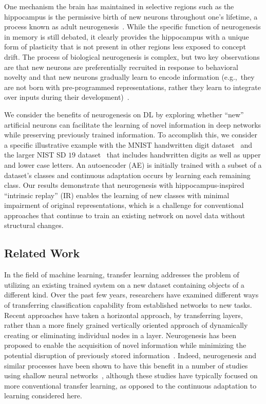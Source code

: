 \documentclass[10pt,conference]{IEEEtran}
\begin{document}
One mechanism the brain has maintained in selective regions such as the hippocampus is the permissive birth of new neurons throughout one's lifetime, a process known as adult neurogenesis~\cite{aimone2014regulation}. While the specific function of neurogenesis in memory is still debated, it clearly provides the hippocampus with a unique form of plasticity that is not present in other regions less exposed to concept drift. The process of biological neurogenesis is complex, but two key observations are that new neurons are preferentially recruited in response to behavioral novelty and that new neurons gradually learn to encode information (e.g.,~they are not born with pre-programmed representations, rather they learn to integrate over inputs during their development)~\cite{aimone2011resolving}.

We consider the benefits of neurogenesis on DL by exploring whether ``new'' artificial neurons can facilitate the learning of novel information in deep networks while preserving previously trained information. To accomplish this, we consider a specific illustrative example with the MNIST handwritten digit dataset~\cite{lecun1998gradient} and the larger NIST SD $19$ dataset~\cite{grother1995nist} that includes handwritten digits as well as upper and lower case letters. An autoencoder (AE) is initially trained with a subset of a dataset's classes and continuous adaptation occurs by learning each remaining class. Our results demonstrate that neurogenesis with hippocampus-inspired ``intrinsic replay'' (IR) enables the learning of new classes with minimal impairment of original representations, which is a challenge for conventional approaches that continue to train an existing network on novel data without structural changes.
\subsection{Related Work}
In the field of machine learning, transfer learning addresses the problem of utilizing an existing trained system on a new dataset containing objects of a different kind. Over the past few years, researchers have examined different ways of transferring classification capability from established networks to new tasks. Recent approaches have taken a horizontal approach, by transferring layers, rather than a more finely grained vertically oriented approach of dynamically creating or eliminating individual nodes in a layer. Neurogenesis has been proposed to enable the acquisition of novel information while minimizing the potential disruption of previously stored information~\cite{aimone2011resolving}. Indeed, neurogenesis and similar processes have been shown to have this benefit in a number of studies using shallow neural networks~\cite{appleby2011role, appleby2009additive, carpenter1988art, chambers2007network, chambers2004simulated, crick2006apoptosis,wiskott2006functional,aimone2011modeling}, although these studies have typically focused on more conventional transfer learning, as opposed to the continuous adaptation to learning considered here.
\end{document}
